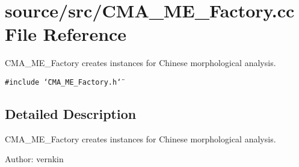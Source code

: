 \section{source/src/CMA\_\-ME\_\-Factory.cc File Reference}
\label{CMA__ME__Factory_8cc}
CMA\_\-ME\_\-Factory creates instances for Chinese morphological analysis.  


{\tt \#include \char`\"{}CMA\_\-ME\_\-Factory.h\char`\"{}}\par


\subsection{Detailed Description}
CMA\_\-ME\_\-Factory creates instances for Chinese morphological analysis. 

\begin{Desc}
\item[Author:]vernkin \end{Desc}
